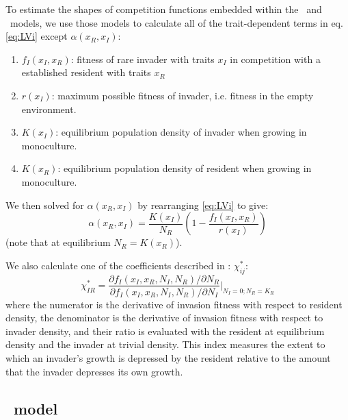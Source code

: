 \documentclass[a4paper,11pt]{article}
\begin{document}
To estimate the shapes of competition functions embedded within the
\Rstar\ and \plant\ models, we use those models to calculate all of
the trait-dependent terms in eq. \ref{eq:LVi} except $\alpha(x_R,
x_I)$:
\begin{enumerate}
\item $f_I(x_I, x_R)$: fitness of rare invader with traits $x_I$  in
  competition with a established resident with traits $x_R$
\item $r(x_I)$: maximum possible fitness of invader, i.e. fitness in
  the empty environment.
\item $K(x_I)$: equilibrium population density of invader when growing
  in monoculture.
\item $K(x_R)$: equilibrium population density of resident when
  growing in monoculture.
\end{enumerate}
We then solved for $\alpha(x_R, x_I)$ by rearranging  \ref{eq:LVi} to give:
\begin{equation}
  \label{eq:alpha}
  \alpha(x_R, x_I) = \frac{K(x_I)}{N_R}
  \left(1 - \frac{f_I(x_I, x_R)}{r(x_I)}\right)
\end{equation}
(note that at equilibrium $N_R = K(x_R)$).

We also calculate one of the coefficients described in
\citet{Abrams-2008}: $\chi_{ij}^{*}$:
%
\begin{equation}
  \label{eq:abrams-coef}
  \chi_{IR}^{*} =
  \frac{\partial f_I(x_I, x_R, N_I, N_R) /  \partial N_R}%
  {\partial f_I(x_I, x_R, N_I, N_R) / \partial N_I}
  \bigg|_{N_I=0; N_R=K_{R}}
\end{equation}
%
where the numerator is the derivative of invasion fitness with respect
to resident density, the denominator is the derivative of invasion
fitness with respect to invader density, and their ratio is evaluated with the resident at equilibrium density and the invader at
trivial density.  This index measures the extent to which an invader's growth is depressed by the resident relative to the amount
that the invader depresses its own growth.

\subsection{\Rstar\ model}

\end{document}

